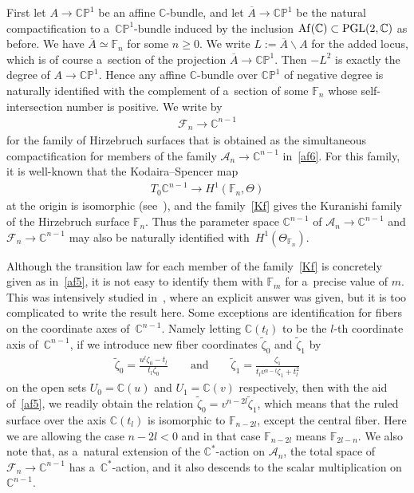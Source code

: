 \documentclass[11pt]{article}
\numberwithin{equation}{section}
\begin{document}
First let $A\to \mathbb{CP}^1$ be an af\/f\/ine $\mathbb{C}$-bundle, and let $\overline A\to \mathbb{CP}^1$ be the
natural compactif\/ication to a~$\mathbb{CP}^1$-bundle induced by the inclusion ${\rm Af}(\mathbb{C})\subset
\mathrm{PGL}(2,\mathbb{C})$ as before.
We have $\overline A\simeq \mathbb{F}_n$ for some $n\ge 0$.
We write $L:= \overline A\backslash A$ for the added locus, which is of course a~section of the projection $\overline A\to \mathbb{CP}^1$.
Then $-L^2$ is exactly the degree of $A\to \mathbb{CP}^1$.
Hence any af\/f\/ine $\mathbb{C}$-bundle over $\mathbb{CP}^1$ of negative degree is naturally identif\/ied with the
complement of a~section of some $\mathbb{F}_n$ whose self-intersection number is positive.
We write by
\begin{gather}
\label{Kf}
\mathscr F_n\to \mathbb{C}^{n-1}
\end{gather}
for the family of Hirzebruch surfaces that is obtained as the simultaneous compactif\/ication for members of the family
$\mathscr A_n\to \mathbb{C}^{n-1}$ in~\eqref{af6}.
For this family, it is well-known that the Kodaira--Spencer map
\begin{gather}
\label{ks001}
T_0\mathbb{C}^{n-1}\to H^1(\mathbb{F}_n,\Theta)
\end{gather}
at the origin is isomorphic (see~\cite[pp.~309--312]{K}), and the family~\eqref{Kf} gives the Kuranishi family of the
Hirzebruch surface $\mathbb{F}_n$.
Thus the parameter space $\mathbb{C}^{n-1}$ of $\mathscr A_n\to\mathbb{C}^{n-1}$ and $\mathscr F_n\to\mathbb{C}^{n-1}$
may also be naturally identif\/ied with~$H^1(\Theta_{\mathbb{F}_n})$.

Although the transition law for each member of the family~\eqref{Kf} is concretely given as in~\eqref{af5}, it is not
easy to identify them with $\mathbb{F}_m$ for a~precise value of $m$.
This was intensively studied in~\cite[p.~143, Theorem]{Suwa}, where an explicit answer was given, but it is too
complicated to write the result here.
Some exceptions are identif\/ication for f\/ibers on the coordinate axes of~$\mathbb{C}^{n-1}$.
Namely letting $\mathbb{C}(t_l)$ to be the $l$-th coordinate axis of~$\mathbb{C}^{n-1}$, if we introduce new f\/iber
coordinates $\tilde{\zeta}_0$ and $\tilde{\zeta}_1$ by
\begin{gather}
\label{zeta'}
\tilde{\zeta}_0 = \frac{u^l\zeta_0-t_l}{t_l\zeta_0}
\qquad
\text{and}
\qquad
\tilde{\zeta}_1= \frac{\zeta_1}{t_lv^{n-l}\zeta_1 + t_l^2}
\end{gather}
on the open sets $U_0=\mathbb{C}(u)$ and $U_1=\mathbb{C}(v)$ respectively, then with the aid of~\eqref{af5}, we readily
obtain the relation $\tilde{\zeta}_0 = v^{n-2l}\tilde{\zeta}_1$, which means that the ruled surface over the axis
$\mathbb{C}(t_l)$ is isomorphic to $\mathbb{F}_{n-2l}$, except the central f\/iber.
Here we are allowing the case $n-2l<0$ and in that case $\mathbb{F}_{n-2l}$ means $\mathbb{F}_{2l-n}$.
We also note that, as a~natural extension of the $\mathbb{C}^*$-action on $\mathscr A_n$, the total space of $\mathscr
F_n\to\mathbb{C}^{n-1}$ has a~$\mathbb{C}^*$-action, and it also descends to the scalar multiplication on $\mathbb{C}^{n-1}$.
\end{document}
